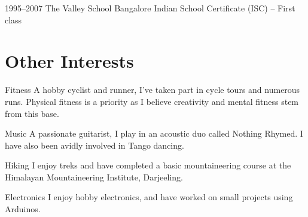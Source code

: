 \documentclass[10pt,a4paper,sans]{moderncv}        %
\begin{document}
\cventry
{\textcolor{light}{1995--2007}}
{The Valley School}
{Bangalore}
{}
{}
{Indian School Certificate (ISC) -- First class}

\vspace{10pt}

\section{Other Interests}

\vspace{6pt}

\cvline
{\textcolor{light}{Fitness}}
{A hobby cyclist and runner, I've taken part in cycle tours and numerous runs. Physical fitness is a priority as I believe creativity and mental fitness stem from this base.}

\vspace{6pt}

\cvline
{\textcolor{light}{Music}}
{A passionate guitarist, I play in an acoustic duo called Nothing Rhymed. I have also been avidly involved in Tango dancing.}

\vspace{6pt}

\cvline
{\textcolor{light}{Hiking}}
{I enjoy treks and have completed a basic mountaineering course at the Himalayan Mountaineering Institute, Darjeeling.}

\vspace{6pt}

\cvline
{\textcolor{light}{Electronics}}
{I enjoy hobby electronics, and have worked on small projects using Arduinos.}

\vspace{6pt}

\nocite{*}



\end{document}
